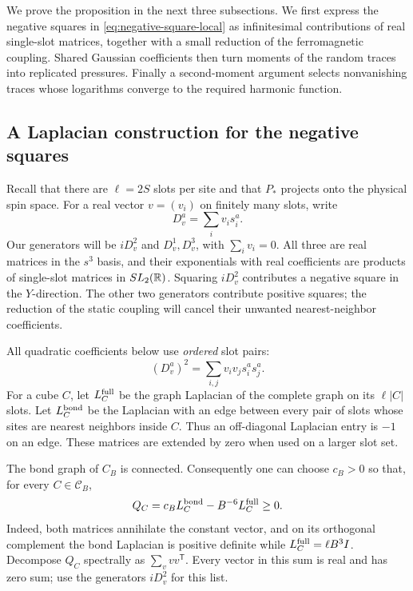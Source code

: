 We prove the proposition in the next three subsections.  We first
express the negative squares in
\eqref{eq:negative-square-local} as infinitesimal contributions of real
single-slot matrices, together with a small reduction of the
ferromagnetic coupling.  Shared Gaussian coefficients then turn moments
of the random traces into replicated pressures.  Finally a second-moment
argument selects nonvanishing traces whose logarithms converge to the
required harmonic function.

\subsection{A Laplacian construction for the negative squares}

Recall that there are $\ell=2S$ slots per site and that $P_*$ projects
onto the physical spin space.  For a real vector $v=(v_i)$ on finitely
many slots, write
\[
 D_v^a=\sum_i v_i s_i^a.
\]
Our generators will be $iD_v^2$ and $D_v^1,D_v^3$, with $\sum_i v_i=0$.
All three are real matrices in the $s^3$ basis, and their exponentials
with real coefficients are products of single-slot matrices in
$SL_2(\mathbb R)$.  Squaring $iD_v^2$ contributes a negative square in the
$Y$-direction.  The other two generators contribute positive squares;
the reduction of the static coupling will cancel their unwanted
nearest-neighbor coefficients.

All quadratic coefficients below use \emph{ordered} slot pairs:
\[
 (D_v^a)^2=\sum_{i,j}v_iv_j s_i^a s_j^a.
\]
For a cube $C$, let $L_C^{\rm full}$ be the graph Laplacian of the
complete graph on its $\ell|C|$ slots.  Let $L_C^{\rm bond}$ be the
Laplacian with an edge between every pair of slots whose sites are
nearest neighbors inside $C$.  Thus an off-diagonal Laplacian entry is
$-1$ on an edge.  These matrices are extended by zero when used on a
larger slot set.

The bond graph of $C_B$ is connected.  Consequently one can choose
$c_B>0$ so that, for every $C\in\mathcal C_B$,
\begin{equation}
 Q_C=c_B L_C^{\rm bond}-B^{-6}L_C^{\rm full}\ge0.
 \label{eq:small-cube-covariance}
\end{equation}
Indeed, both matrices annihilate the constant vector, and on its
orthogonal complement the bond Laplacian is positive definite while
$L_C^{\rm full}=\ell B^3I$.  Decompose $Q_C$ spectrally as
$\sum_v vv^{\mathsf T}$.  Every vector in this sum is real and has zero
sum; use the generators $iD_v^2$ for this list.

